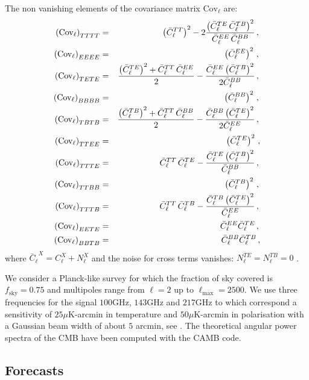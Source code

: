 \documentclass[12pt]{article}
\newcommand{\nn}{{\nonumber}}
\newcommand{\cellb}{{\bar{C}_\ell}}
\newcommand{\covl}{{\left(\text{Cov}_\ell\right)}}
\newcommand{\bea}{\begin{eqnarray}}
\newcommand{\eea}{\end{eqnarray}}
\begin{document}
The non vanishing elements of the covariance matrix $\text{Cov}_\ell$ are:
\bea
\covl_{TTTT} &=& \left(\cellb^{TT}\right)^2-2\frac{\left(\cellb^{TE}\,\cellb^{TB}\right)^2}{\cellb^{EE}\,\cellb^{BB}}\,,\nn\\
\covl_{EEEE} &=& \left(\cellb^{EE}\right)^2\,, \nn\\
\covl_{TETE} &=& \frac{\left(\cellb^{TE}\right)^2+\cellb^{TT}\,\cellb^{EE}}{2}-\frac{\cellb^{EE}\left(\cellb^{TB}\right)^2}{2\cellb^{BB}}\,,\nn\\
\covl_{BBBB} &=& \left(\cellb^{BB}\right)^2\,, \nn \\
\covl_{TBTB} &=& \frac{\left(\cellb^{TB}\right)^2+\cellb^{TT}\,\cellb^{BB}}{2}-\frac{\cellb^{BB}\left(\cellb^{TE}\right)^2}{2\cellb^{EE}}\,,\nn\\
\covl_{TTEE} &=& \left(\cellb^{TE}\right)^2\,, \\
\covl_{TTTE} &=& \cellb^{TT}\,\cellb^{TE}-\frac{\cellb^{TE}\left(\cellb^{TB}\right)^2}{\cellb^{BB}}\,,\nn\\
\covl_{TTBB} &=& \left(\cellb^{TB}\right)^2\,, \nn\\
\covl_{TTTB} &=& \cellb^{TT}\,\cellb^{TB}-\frac{\cellb^{TB}\left(\cellb^{TE}\right)^2}{\cellb^{EE}}\,,\nn\\
\covl_{EETE} &=& \cellb^{EE}\cellb^{TE}\,, \nn\\
\covl_{BBTB} &=& \cellb^{BB}\cellb^{TB}\,\nn, 
\eea
where $\cellb^X=C_\ell^X+N_\ell^X$ and the noise for cross terms vanishes: $N_\ell^{TE}=N_\ell^{TB}=0$ .

We consider a Planck-like survey for which the fraction of sky covered is $f_\text{sky} = 0.75$ and multipoles range from $\ell = 2$ up to $\ell_\text{max} = 2500$. We use three frequencies for the signal $100$GHz, $143$GHz and $217$GHz to which correspond a sensitivity of $25\mu$K-arcmin in temperature and $50\mu$K-arcmin in polarisation with a Gaussian beam width of about $5$ arcmin, see \cite{AdamWUA}.
The theoretical angular power spectra of the CMB have been computed with the CAMB code.








\subsection{Forecasts}  
\end{document}
